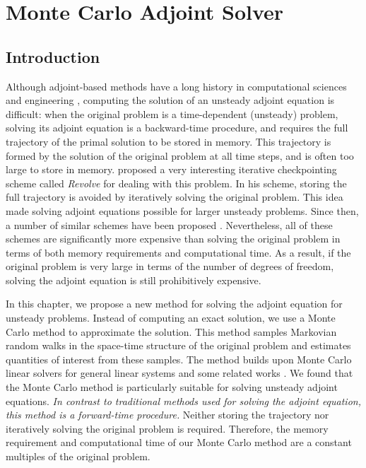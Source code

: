 \chapter{Monte Carlo Adjoint Solver}

\section{Introduction}
    Although adjoint-based methods have a long history in computational sciences
    and engineering \cite[]{Bryson1969}, computing the
    solution of an unsteady adjoint equation is difficult: when the original 
    problem is a time-dependent (unsteady) problem, solving its adjoint
    equation is a backward-time procedure, and requires the full trajectory
    of the primal solution to be stored in memory.  This trajectory is formed
    by the solution of the original problem at all time steps, and is 
    often too large to store in memory.  \cite{griewank92}
    proposed a very interesting iterative checkpointing scheme called
    \emph{Revolve} for dealing with this problem.  In his scheme, storing the
    full trajectory is
    avoided by iteratively solving the original problem.  This idea made 
    solving adjoint equations possible for larger unsteady problems.
    Since then, a number of similar schemes have been proposed
    \cite[]{charpentier2001} \cite[]{Griewank2004}.  Nevertheless, all of these
    schemes are significantly more expensive than solving the original 
    problem in terms of both memory requirements and computational time.
    As a result, if the original problem is very large in terms of the number
    of degrees of freedom, solving the adjoint equation is still prohibitively
    expensive.
    
    In this chapter, we propose a new method for solving the adjoint
    equation for unsteady problems.  Instead of computing an exact
    solution, we use a Monte Carlo method to approximate the solution.
    This method samples Markovian random walks in the space-time 
    structure of the original problem and estimates quantities of
    interest from these samples.  The method builds upon Monte Carlo
    linear solvers for general linear systems \cite[]{Forsythe1950}
    \cite[]{Dimov1998} \cite[]{Tan2002} \cite[]{Okten2005} and some related works
    \cite[]{Hanrahan2000}. 
    We found that the Monte Carlo method is particularly
    suitable for solving unsteady adjoint equations.  \emph{In contrast to
    traditional methods used for solving the adjoint equation, this method is
    a forward-time procedure.}  Neither storing the trajectory 
    nor iteratively solving the original problem is required.  Therefore,
    the memory requirement and computational time of our Monte Carlo method
    are a constant multiples of the original problem.
    
